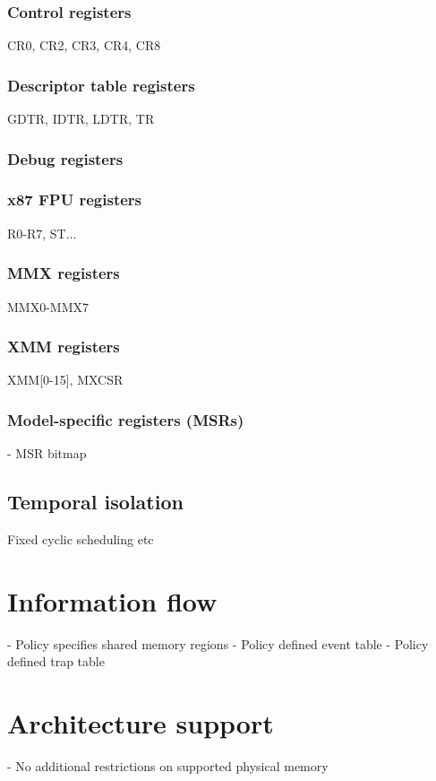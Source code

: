 \subsubsection{Control registers}
CR0, CR2, CR3, CR4, CR8

\subsubsection{Descriptor table registers}
GDTR, IDTR, LDTR, TR

\subsubsection{Debug registers}

\subsubsection{x87 FPU registers}
R0-R7, ST...

\subsubsection{MMX registers}
MMX0-MMX7

\subsubsection{XMM registers}
XMM[0-15], MXCSR

\subsubsection{Model-specific registers (MSRs)}
- MSR bitmap

\subsection{Temporal isolation}
Fixed cyclic scheduling etc

\section{Information flow}
- Policy specifies shared memory regions
- Policy defined event table
- Policy defined trap table

\section{Architecture support}
- No additional restrictions on supported physical memory

